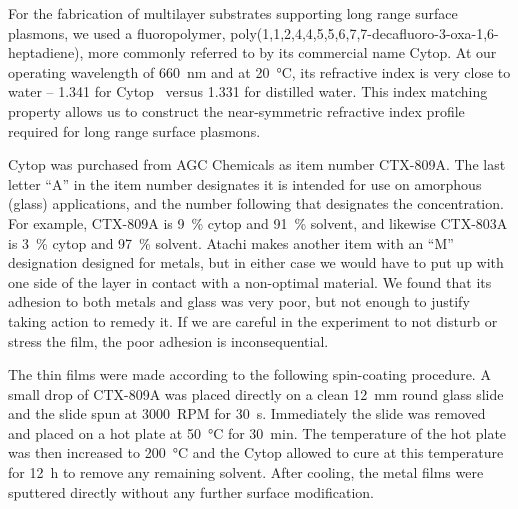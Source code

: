 For the fabrication of multilayer substrates supporting long range surface
plasmons, we used a fluoropolymer,
poly(1,1,2,4,4,5,5,6,7,7-decafluoro-3-oxa-1,6-heptadiene), more commonly
referred to by its commercial name Cytop.  At our operating wavelength of
\SI{660}{\nano\meter} and at \SI{20}{\celsius}, its refractive index is
very close to water --
1.341 for Cytop~\cite{mikevs2005synthesis} versus 1.331 for distilled
water.  This index matching property allows us to construct the
near-symmetric refractive index profile required for long range surface
plasmons.

Cytop was purchased from AGC Chemicals as item number CTX-809A.  The last
letter ``A'' in the item number designates it is intended for use on
amorphous (glass) applications, and the number following that designates
the concentration.  For example, CTX-809A is \SI{9}{\percent} cytop and
\SI{91}{\percent} solvent, and likewise CTX-803A is \SI{3}{\percent} cytop
and \SI{97}{\percent} solvent.  Atachi makes another item with an ``M''
designation designed for metals, but in either case we would have to put up
with one side of the layer in contact with a non-optimal material.  We
found that its adhesion to both metals and glass was very poor, but not
enough to justify taking action to remedy it.  If we are careful in the
experiment to not disturb or stress the film, the poor adhesion is
inconsequential.

The thin films were made according to the following spin-coating procedure.
A small drop of CTX-809A was placed directly on a clean
\SI{12}{\milli\meter} round glass slide and the slide spun at
\SI{3000}{RPM} for \SI{30}{\second}.  Immediately the slide was removed and
placed on a hot plate at \SI{50}{\celsius} for \SI{30}{\minute}.  The
temperature of the hot plate was then increased to \SI{200}{\celsius} and
the Cytop allowed to cure at this temperature for \SI{12}{\hour} to remove
any remaining solvent.  After cooling, the metal films were sputtered
directly without any further surface modification.

